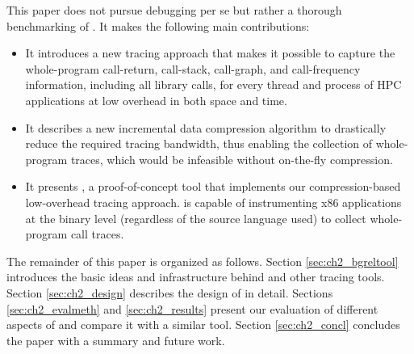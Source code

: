 %
This paper does not pursue debugging per se but rather a thorough benchmarking of \parlot. It makes the following main contributions:
%

\begin{itemize}
\item It introduces a new tracing approach that makes it possible to capture the whole-program call-return, call-stack, call-graph, and call-frequency information, including all library calls, for every thread and process of HPC applications at low overhead in both space and time.
\item It describes a new incremental data compression algorithm to drastically reduce the required tracing bandwidth, thus enabling the collection of whole-program traces, which would be infeasible without on-the-fly compression.
\item It presents \parlot, a proof-of-concept tool that implements our compression-based low-overhead tracing approach. \parlot is capable of instrumenting x86 applications at the binary level (regardless of the source language used) to collect whole-program call traces.
\end{itemize}
%
The remainder of this paper is organized as follows. Section \ref{sec:ch2_bgreltool} introduces the basic ideas and infrastructure behind \parlot and other tracing tools. Section \ref{sec:ch2_design} describes the design of \parlot in detail. Sections \ref{sec:ch2_evalmeth} and \ref{sec:ch2_results} present our evaluation of different aspects of \parlot and compare it with a similar tool. Section \ref{sec:ch2_concl} concludes the paper with a summary and future work.
